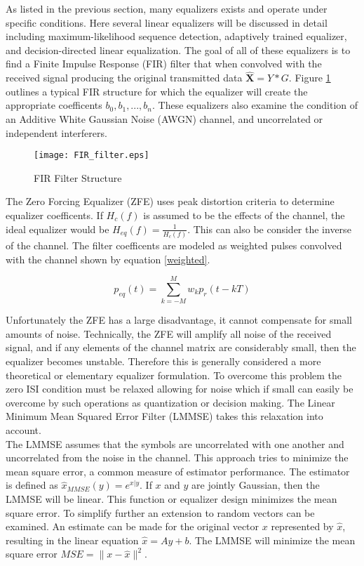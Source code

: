As listed in the previous section, many equalizers exists and operate under specific conditions.  Here several linear equalizers will be discussed in detail including maximum-likelihood sequence detection, adaptively trained equalizer, and decision-directed linear equalization.  The goal of all of these equalizers is to find a Finite Impulse Response (FIR) filter that when convolved with the received signal producing the original transmitted data \( \boldsymbol{\hat{X}}=Y * G \).  Figure \ref{FIR_filter} outlines a typical FIR structure for which the equalizer will create the appropriate coefficents \(b_{0},b_{1},..., b_{n} \).  These equalizers also examine the condition of an Additive White Gaussian Noise (AWGN) channel, and uncorrelated or independent interferers.\\

\begin{figure}[!ht]\label{FIR_filter}
\centering
\texttt{[image: FIR\_filter.eps]}
\caption{FIR Filter Structure}
\end{figure}

The Zero Forcing Equalizer (ZFE) uses peak distortion criteria to determine equalizer coefficents.  If \(H_{c}(f)\) is assumed to be the effects of the channel, the ideal equalizer would be \( H_{eq}(f)=\frac{1}{H_{c}(f)}\).  This can also be consider the inverse of the channel.  The filter coefficents are modeled as weighted pulses convolved with the channel shown by equation \eqref{weighted}.

\begin{equation}\label{weighted}
p_{eq}(t) = \displaystyle\sum_{k=-M}^{M} w_{k}p_{r}(t-kT)
\end{equation}

Unfortunately the ZFE has a large disadvantage, it cannot compensate for small amounts of noise.  Technically, the ZFE will amplify all noise of the received signal, and if any elements of the channel matrix are considerably small, then the equalizer becomes unstable. Therefore this is generally considered a more theoretical or elementary equalizer formulation.  To overcome this problem the zero ISI condition must be relaxed allowing for noise which if small can easily be overcome by such operations as quantization or decision making.  The Linear Minimum Mean Squared Error Filter (LMMSE) takes this relaxation into account.\\ 

The LMMSE assumes that the symbols are uncorrelated with one another and uncorrelated from the noise in the channel.  This approach tries to minimize the mean square error, a common measure of estimator performance.  The estimator is defined as \(\hat{x}_{MMSE}(y)=e^{x|y}\).  If \(x\) and \(y\) are jointly Gaussian, then the LMMSE will be linear.  This function or equalizer design minimizes the mean square error.  To simplify further an extension to random vectors can be examined.  An estimate can be made for the original vector \(x\) represented by \(\hat{x}\), resulting in the linear equation \(\hat{x}=Ay+b\).  The LMMSE will minimize the mean square error \(MSE = \|x-\hat{x}\|^{2}\).\\

